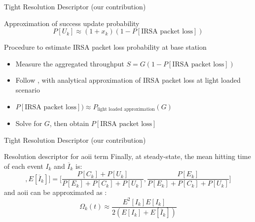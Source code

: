 \documentclass[9pt]{beamer}
\begin{document}
\begin{frame}{Tight Resolution Descriptor (our contribution)}
    \begin{block}{Approximation of success update probability}
        \begin{equation}
            P[U_k] \approx (1 + x_k) (1 - P[\text{IRSA packet loss}])
        \end{equation}
    \end{block}
    \begin{block}{Procedure to estimate IRSA packet loss probability at base station}
        \begin{itemize}
            \item Measure the aggregated throughput $S = G(1 - P[\text{IRSA packet loss}])$
            \item Follow , with analytical approximation of IRSA packet loss at light loaded scenario
            \item $P[\text{IRSA packet loss}]) \approx P_{\text{light loaded approximation}}(G)$
            \item Solve for $G$, then obtain $P[\text{IRSA packet loss}]$
        \end{itemize}
    \end{block}
\end{frame}

\begin{frame}{Tight Resolution Descriptor (our contribution)}
    \begin{block}{Resolution descriptor for \gls{aoii} term}
        Finally, at steady-state, the mean hitting time of each event $I_k$ and $\overline{I}_k$ is:
        \begin{equation}
            [E[I_k], E[\overline{I}_k]] = \Big[ \frac{P[C_k] + P[U_k]}{P[E_k] + P[C_k] + P[U_k]}, \frac{P[E_k]}{P[E_k] + P[C_k] + P[U_k]} \Big]
        \end{equation}
        and \gls{aoii} can be approximated as :
        \begin{equation}
            \Omega_k(t) \approx \frac{E^2[I_k]E[I_k]}{2(E[I_k] + E[\overline{I}_k])}
        \end{equation}
    \end{block}
\end{frame}
\end{document}
